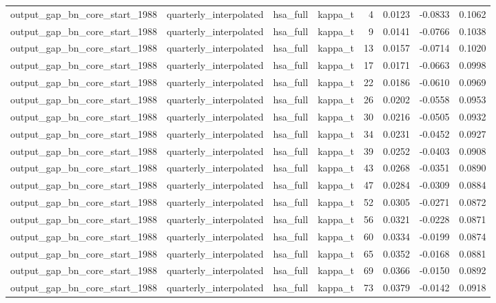 \begin{tabular}{llllrrrr}
output\_gap\_bn\_core\_start\_1988 & quarterly\_interpolated & hsa\_full & kappa\_t & 4 & 0.0123 & -0.0833 & 0.1062 \\
output\_gap\_bn\_core\_start\_1988 & quarterly\_interpolated & hsa\_full & kappa\_t & 9 & 0.0141 & -0.0766 & 0.1038 \\
output\_gap\_bn\_core\_start\_1988 & quarterly\_interpolated & hsa\_full & kappa\_t & 13 & 0.0157 & -0.0714 & 0.1020 \\
output\_gap\_bn\_core\_start\_1988 & quarterly\_interpolated & hsa\_full & kappa\_t & 17 & 0.0171 & -0.0663 & 0.0998 \\
output\_gap\_bn\_core\_start\_1988 & quarterly\_interpolated & hsa\_full & kappa\_t & 22 & 0.0186 & -0.0610 & 0.0969 \\
output\_gap\_bn\_core\_start\_1988 & quarterly\_interpolated & hsa\_full & kappa\_t & 26 & 0.0202 & -0.0558 & 0.0953 \\
output\_gap\_bn\_core\_start\_1988 & quarterly\_interpolated & hsa\_full & kappa\_t & 30 & 0.0216 & -0.0505 & 0.0932 \\
output\_gap\_bn\_core\_start\_1988 & quarterly\_interpolated & hsa\_full & kappa\_t & 34 & 0.0231 & -0.0452 & 0.0927 \\
output\_gap\_bn\_core\_start\_1988 & quarterly\_interpolated & hsa\_full & kappa\_t & 39 & 0.0252 & -0.0403 & 0.0908 \\
output\_gap\_bn\_core\_start\_1988 & quarterly\_interpolated & hsa\_full & kappa\_t & 43 & 0.0268 & -0.0351 & 0.0890 \\
output\_gap\_bn\_core\_start\_1988 & quarterly\_interpolated & hsa\_full & kappa\_t & 47 & 0.0284 & -0.0309 & 0.0884 \\
output\_gap\_bn\_core\_start\_1988 & quarterly\_interpolated & hsa\_full & kappa\_t & 52 & 0.0305 & -0.0271 & 0.0872 \\
output\_gap\_bn\_core\_start\_1988 & quarterly\_interpolated & hsa\_full & kappa\_t & 56 & 0.0321 & -0.0228 & 0.0871 \\
output\_gap\_bn\_core\_start\_1988 & quarterly\_interpolated & hsa\_full & kappa\_t & 60 & 0.0334 & -0.0199 & 0.0874 \\
output\_gap\_bn\_core\_start\_1988 & quarterly\_interpolated & hsa\_full & kappa\_t & 65 & 0.0352 & -0.0168 & 0.0881 \\
output\_gap\_bn\_core\_start\_1988 & quarterly\_interpolated & hsa\_full & kappa\_t & 69 & 0.0366 & -0.0150 & 0.0892 \\
output\_gap\_bn\_core\_start\_1988 & quarterly\_interpolated & hsa\_full & kappa\_t & 73 & 0.0379 & -0.0142 & 0.0918 \\

\end{tabular}
